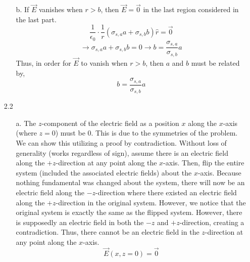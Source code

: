 \documentclass[12pt]{article}
\begin{document}
\begin{enumerate}
\begin{enumerate}
		\item [b.]
		If $\vec E$ vanishes when $r>b$, then $\vec E = \vec 0$ in the last region considered in the last part.
		\[\frac{1}{\epsilon_0}\cdot\frac{1}{r}\left(\sigma_{s,a}a + \sigma_{s,b}b\right)\hat r= \vec 0\]
		\[\to \sigma_{s,a}a + \sigma_{s,b}b = 0 \to b = \frac{\sigma_{s,a}}{\sigma_{s,b}}a\]
		Thus, in order for $\vec E$ to vanish when $r>b$, then $a$ and $b$ must be related by,
		\[\boxed{b = \frac{\sigma_{s,a}}{\sigma_{s,b}}a}\]
	\end{enumerate}

	\item [2.2]
	\begin{enumerate}
		\item [a.]
		The $z$-component of the electric field as a position $x$ along the $x$-axis (where $z=0$) must be 0.
		This is due to the symmetries of the problem.
		We can show this utilizing a proof by contradiction.
		Without loss of generality (works regardless of sign), assume there is an electric field along the $+z$-direction at any point along the $x$-axis.
		Then, flip the entire system (included the associated electric fields) about the $x$-axis.
		Because nothing fundamental was changed about the system, there will now be an electric field along the $-z$-direction where there existed an electric field along the $+z$-direction in the original system.
		However, we notice that the original system is exactly the same as the flipped system.
		However, there is supposedly an electric field in both the $-z$ and $+z$-direction, creating a contradiction.
		Thus, there cannot be an electric field in the $z$-direction at any point along the $x$-axis.
		\[\boxed{\vec E(x, z=0) = \vec 0}\]


\end{enumerate}
\end{enumerate}
\end{document}
